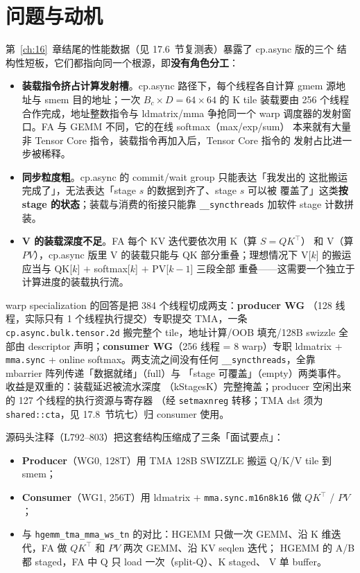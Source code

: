 \section{问题与动机}

第~\ref{ch:16}~章结尾的性能数据（见 17.6~节复测表）暴露了 cp.async 版的三个
结构性短板，它们都指向同一个根源，即\textbf{没有角色分工}：

\begin{itemize}
  \item \textbf{装载指令挤占计算发射槽}。cp.async 路径下，每个线程各自计算
        gmem 源地址与 smem 目的地址；一次 $B_c \times D = 64 \times 64$ 的 K tile
        装载要由 256 个线程合作完成，地址整数指令与 ldmatrix/mma 争抢同一个
        warp 调度器的发射窗口。FA 与 GEMM 不同，它的在线 softmax（max/exp/sum）
        本来就有大量非 Tensor Core 指令，装载指令再加入后，Tensor Core 指令的
        发射占比进一步被稀释。
  \item \textbf{同步粒度粗}。cp.async 的 commit/wait group 只能表达「我发出的
        这批搬运完成了」，无法表达「stage $s$ 的数据到齐了、stage $s$ 可以被
        覆盖了」这类\textbf{按 stage 的状态}；装载与消费的衔接只能靠
        \texttt{\_\allowbreak{}\_\allowbreak{}syncthreads} 加软件 stage 计数拼装。
  \item \textbf{V 的装载深度不足}。FA 每个 KV 迭代要依次用 K（算 $S = QK^\top$）
        和 V（算 $PV$），cp.async 版里 V 的装载只能与 QK 部分重叠；理想情况下
        V[$k$] 的搬运应当与 QK[$k$] $+$ softmax[$k$] $+$ PV[$k{-}1$] 三段全部
        重叠——这需要一个独立于计算进度的装载执行流。
\end{itemize}

warp specialization 的回答是把 384 个线程切成两支：\textbf{producer WG}
（128 线程，实际只有 1 个线程执行提交）专职提交 TMA，一条
\texttt{cp.\allowbreak{}async.\allowbreak{}bulk.\allowbreak{}tensor.2d} 搬完整个 tile，地址计算/OOB 填充/128B swizzle
全部由 descriptor 声明；\textbf{consumer WG}（256 线程 = 8 warp）专职
ldmatrix + \texttt{mma.sync} + online softmax。两支流之间没有任何
\texttt{\_\allowbreak{}\_\allowbreak{}syncthreads}，全靠 mbarrier 阵列传递「数据就绪」（full）与
「stage 可覆盖」（empty）两类事件。收益是双重的：装载延迟被流水深度
（kStagesK）完整掩盖；producer 空闲出来的 127 个线程的执行资源与寄存器
（经 \texttt{setmaxnreg} 转移；TMA dst 须为 \texttt{shared::cta}，见 17.8~节坑七）归 consumer 使用。

源码头注释（L792--803）把这套结构压缩成了三条「面试要点」：

\begin{itemize}
  \item \textbf{Producer}（WG0, 128T）用 TMA 128B SWIZZLE 搬运 Q/K/V tile 到
        smem；
  \item \textbf{Consumer}（WG1, 256T）用 ldmatrix $+$
        \texttt{mma.\allowbreak{}sync.\allowbreak{}m16n8k16} 做 $QK^\top$ / $PV$；
  \item 与 \texttt{hgemm\_tma\_mma\_ws\_tn} 的对比：HGEMM 只做一次 GEMM、沿
        K 维迭代，FA 做 $QK^\top$ 和 $PV$ 两次 GEMM、沿 KV seqlen 迭代；
        HGEMM 的 A/B 都 staged，FA 中 Q 只 load 一次（split-Q）、K staged、
        V 单 buffer。
\end{itemize}

